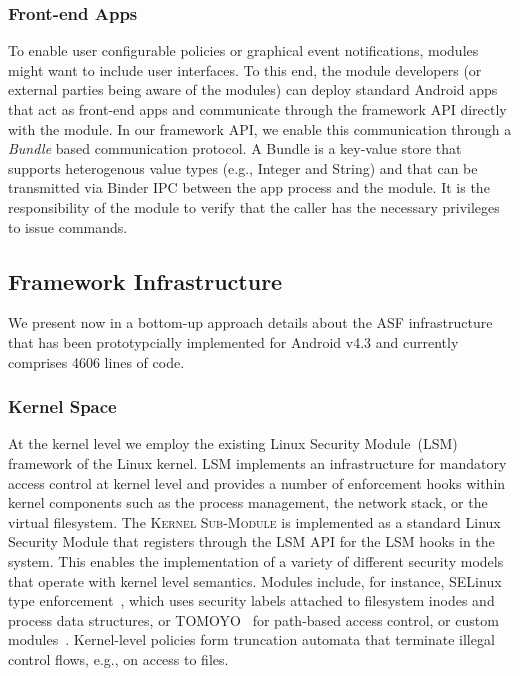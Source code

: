 \documentclass[letterpaper,twocolumn,10pt]{article}
\newcommand{\OURSHORT}{\textsc{ASF}\xspace}
\newcommand{\KMODULE}{\textsc{Kernel Sub-Module}\xspace}
\begin{document}
\subsubsection{Front-end Apps}
To enable user configurable policies or graphical event notifications, modules might want to include user interfaces. To this end, the module developers (or external parties being aware of the modules) can deploy standard Android apps that act as front-end apps and communicate through the framework API directly with the module. In our framework API, we enable this communication through a \textit{Bundle} based communication protocol. A Bundle is a key-value store that supports heterogenous value types (e.g., Integer and String) and that can be transmitted via Binder IPC between the app process and the module. It is the responsibility of the module to verify that the caller has the necessary privileges to issue commands.

\subsection{Framework Infrastructure}
\label{sec:arch:framework}

We present now in a bottom-up approach details about the \OURSHORT infrastructure that has been prototypcially implemented for Android v4.3 and currently comprises 4606 lines of code.

\subsubsection{Kernel Space}

At the kernel level we employ the existing Linux Security Module~(LSM)~\cite{Wright:2002:LSM:647253.720287} framework of the Linux kernel. LSM implements an infrastructure for mandatory access control at kernel level and provides a number of enforcement hooks within kernel components such as the process management, the network stack, or the virtual filesystem. The \KMODULE is implemented as a standard Linux Security Module that registers through the LSM API for the LSM hooks in the system. This enables the implementation of a variety of different security models that operate with kernel level semantics. Modules include, for instance, SELinux type enforcement~\cite{smalley:01}, which uses security labels attached to filesystem inodes and process data structures, or TOMOYO~\cite{tomoyo} for path-based access control, or custom modules~\cite{nadkarni:ccs13}. Kernel-level policies form truncation automata that terminate illegal control flows, e.g., on access to files.
\end{document}
